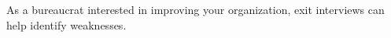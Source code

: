 As a bureaucrat interested in improving your organization, exit interviews can help identify weaknesses. 


